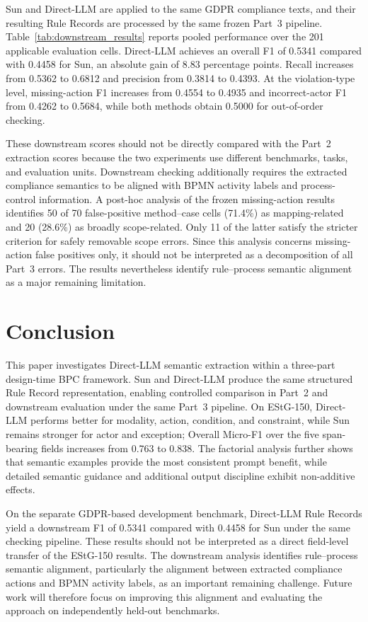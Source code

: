 \documentclass[conference]{IEEEtran}
\begin{document}
Sun and Direct-LLM are applied to the same GDPR compliance texts, and their resulting Rule Records are processed by the same frozen Part~3 pipeline. Table~\ref{tab:downstream_results} reports pooled performance over the 201 applicable evaluation cells. Direct-LLM achieves an overall F1 of 0.5341 compared with 0.4458 for Sun, an absolute gain of 8.83 percentage points. Recall increases from 0.5362 to 0.6812 and precision from 0.3814 to 0.4393. At the violation-type level, missing-action F1 increases from 0.4554 to 0.4935 and incorrect-actor F1 from 0.4262 to 0.5684, while both methods obtain 0.5000 for out-of-order checking.

These downstream scores should not be directly compared with the Part~2 extraction scores because the two experiments use different benchmarks, tasks, and evaluation units. Downstream checking additionally requires the extracted compliance semantics to be aligned with BPMN activity labels and process-control information. A post-hoc analysis of the frozen missing-action results identifies 50 of 70 false-positive method--case cells (71.4\%) as mapping-related and 20 (28.6\%) as broadly scope-related. Only 11 of the latter satisfy the stricter criterion for safely removable scope errors. Since this analysis concerns missing-action false positives only, it should not be interpreted as a decomposition of all Part~3 errors. The results nevertheless identify rule--process semantic alignment as a major remaining limitation.

\section{Conclusion}
\label{sec:6}

This paper investigates Direct-LLM semantic extraction within a three-part design-time BPC framework. Sun and Direct-LLM produce the same structured Rule Record representation, enabling controlled comparison in Part~2 and downstream evaluation under the same Part~3 pipeline. On EStG-150, Direct-LLM performs better for modality, action, condition, and constraint, while Sun remains stronger for actor and exception; Overall Micro-F1 over the five span-bearing fields increases from 0.763 to 0.838. The factorial analysis further shows that semantic examples provide the most consistent prompt benefit, while detailed semantic guidance and additional output discipline exhibit non-additive effects.

On the separate GDPR-based development benchmark, Direct-LLM Rule Records yield a downstream F1 of 0.5341 compared with 0.4458 for Sun under the same checking pipeline. These results should not be interpreted as a direct field-level transfer of the EStG-150 results. The downstream analysis identifies rule--process semantic alignment, particularly the alignment between extracted compliance actions and BPMN activity labels, as an important remaining challenge. Future work will therefore focus on improving this alignment and evaluating the approach on independently held-out benchmarks.
\end{document}
